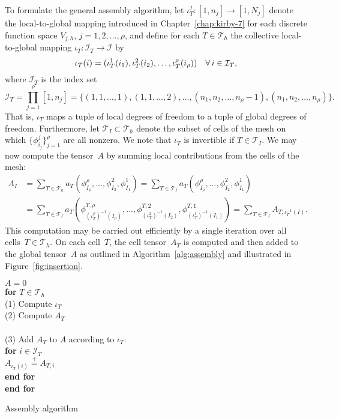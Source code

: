 To formulate the general assembly algorithm, let $\iota_T^j : [1,n_j]
\rightarrow [1,N_j]$ denote the local-to-global mapping introduced in
Chapter~\ref{chap:kirby-7} for each discrete function space $V_{j,h}$,
$j=1,2,\ldots,\rho$, and define for each $T \in \mathcal{T}_h$ the
collective local-to-global mapping $\iota_T : \mathcal{I}_T
\rightarrow \mathcal{I}$ by
\begin{equation}
  \iota_T(i) =
  (\iota_T^1(i_1),\iota_T^2(i_2),\ldots,\iota_T^{\rho}(i_{\rho}))
  \quad \forall\, i \in \mathcal{I}_T,
\end{equation}
where $\mathcal{I}_T$ is the index set
\begin{equation}
  \mathcal{I}_T =
  \prod_{j=1}^{\rho}[1,n_j] = \{(1,1,\ldots,1), (1,1,\ldots,2), \ldots,
  (n_1, n_2, \ldots, n_{\rho} - 1),
  (n_1, n_2, \ldots, n_{\rho})\}.
\end{equation}
That is, $\iota_T$ maps a tuple of local degrees of freedom to a tuple
of global degrees of freedom. Furthermore, let $\mathcal{T}_I \subset
\mathcal{T}_h$ denote the subset of cells of the mesh on which
$\{\phi_{i_j}^j\}_{j=1}^{\rho}$ are all nonzero. We note that
$\iota_T$ is invertible if $T \in \mathcal{T}_I$.  We may now compute
the tensor~$A$ by summing local contributions from the cells of the
mesh:
\begin{equation}
  \begin{split}
  A_I
  &=
  \sum_{T\in\mathcal{T}_h}
  a_T(\phi_{I_{\rho}}^{\rho}, \ldots, \phi_{I_2}^2, \phi_{I_1}^1)
  =
  \sum_{T\in\mathcal{T}_I}
  a_T(\phi_{I_{\rho}}^{\rho}, \ldots, \phi_{I_2}^2, \phi_{I_1}^1) \\
  &=
  \sum_{T\in\mathcal{T}_I}
  a_T(\phi_{(\iota_T^{\rho})^{-1}(I_{\rho})}^{T,{\rho}},
      \ldots,
      \phi_{(\iota_T^2)^{-1}(I_2)}^{T,2},
      \phi_{(\iota_T^1)^{-1}(I_1)}^{T,1})
  =
  \sum_{T\in\mathcal{T}_I}
  A_{T,{\iota_T^{-1}(I)}}.
  \end{split}
\end{equation}
This computation may be carried out efficiently by a single iteration
over all cells~$T \in \mathcal{T}_h$. On each cell~$T$, the cell
tensor~$A_T$ is computed and then added to the global tensor~$A$ as
outlined in Algorithm~\ref{alg:assembly} and illustrated in
Figure~\ref{fig:insertion}.
\begin{algorithm}
  \begin{tabbing}
    $A = 0$\\
    \textbf{for}  {$T \in \mathcal{T}_h$}\\
    \tab (1) Compute $\iota_T$ \\
    \tab (2) Compute $A_T$ \\ \\
    \tab (3) Add $A_T$ to $A$ according to $\iota_T$: \\
    \tab \textbf{for} $i \in \mathcal{I}_T$ \\
    \tab \tab $A_{\iota_T(i)} \stackrel{+}{=} A_{T,i}$ \\
    \tab \textbf{end for} \\
    \textbf{end for}
  \end{tabbing}
  \caption{Assembly algorithm}
  \label{alg:assembly}
\end{algorithm}

